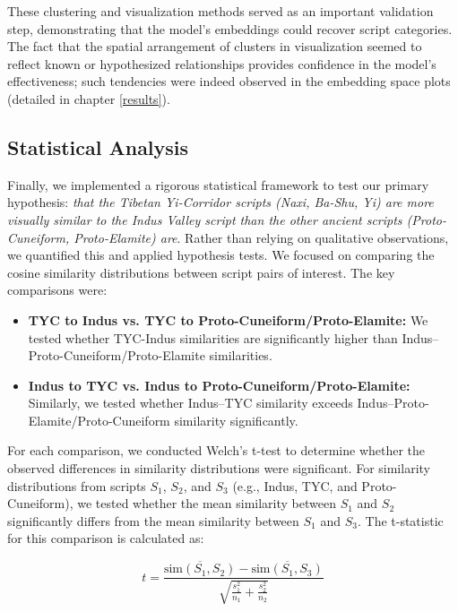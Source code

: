 \documentclass[11pt,a4paper,oneside]{report}
\begin{document}
These clustering and visualization methods served as an important validation step, demonstrating that the model's embeddings could recover script categories. The fact that the spatial arrangement of clusters in visualization seemed to reflect known or hypothesized relationships provides confidence in the model's effectiveness; such tendencies were indeed observed in the embedding space plots (detailed in chapter \ref{results}).

\subsection{Statistical Analysis}
Finally, we implemented a rigorous statistical framework to test our primary hypothesis:\textit{ that the Tibetan Yi-Corridor scripts (Naxi, Ba-Shu, Yi) are more visually similar to the Indus Valley script than the other ancient scripts (Proto-Cuneiform, Proto-Elamite) are}. Rather than relying on qualitative observations, we quantified this and applied hypothesis tests. We focused on comparing the cosine similarity distributions between script pairs of interest. The key comparisons were:

\begin{itemize}
    \item \textbf{TYC to Indus vs. TYC to Proto-Cuneiform/Proto-Elamite:} We tested whether TYC-Indus similarities are significantly higher than Indus–Proto-Cuneiform/Proto-Elamite similarities.
    \item \textbf{Indus to TYC vs. Indus to Proto-Cuneiform/Proto-Elamite:} Similarly, we tested whether Indus–TYC similarity exceeds Indus–Proto-Elamite/Proto-Cuneiform similarity significantly.
\end{itemize}

For each comparison, we conducted Welch's t-test \cite{welch_generalization_1947} to determine whether the observed differences in similarity distributions were significant. For similarity distributions from scripts $S_1$, $S_2$, and $S_3$ (e.g., Indus, TYC, and Proto-Cuneiform), we tested whether the mean similarity between $S_1$ and $S_2$ significantly differs from the mean similarity between $S_1$ and $S_3$. The t-statistic for this comparison is calculated as:

\begin{equation}
t = \frac{\overline{\text{sim}(S_1, S_2)} - \overline{\text{sim}(S_1, S_3)}}{\sqrt{\frac{s_1^2}{n_1} + \frac{s_2^2}{n_2}}}
\end{equation}
\end{document}
